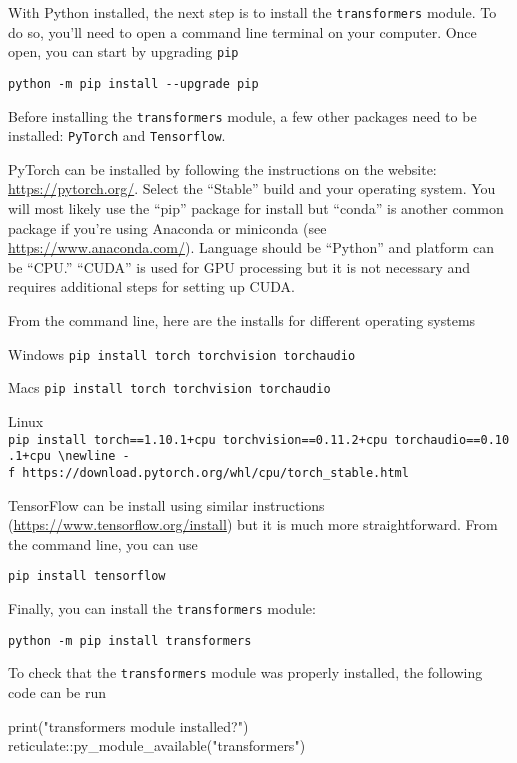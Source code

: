 \documentclass[
]{article}
\newenvironment{Shaded}{\begin{snugshade}}{\end{snugshade}}
\newcommand{\FunctionTok}[1]{\textcolor[rgb]{0.00,0.00,0.00}{#1}}
\newcommand{\NormalTok}[1]{#1}
\newcommand{\SpecialCharTok}[1]{\textcolor[rgb]{0.00,0.00,0.00}{#1}}
\newcommand{\StringTok}[1]{\textcolor[rgb]{0.31,0.60,0.02}{#1}}
\begin{document}
With Python installed, the next step is to install the
\texttt{transformers} module. To do so, you'll need to open a command
line terminal on your computer. Once open, you can start by upgrading
\texttt{pip}

\texttt{python\ -m\ pip\ install\ -\/-upgrade\ pip}

Before installing the \texttt{transformers} module, a few other packages
need to be installed: \texttt{PyTorch} and \texttt{Tensorflow}.

PyTorch can be installed by following the instructions on the website:
\url{https://pytorch.org/}. Select the ``Stable'' build and your
operating system. You will most likely use the ``pip'' package for
install but ``conda'' is another common package if you're using Anaconda
or miniconda (see \url{https://www.anaconda.com/}). Language should be
``Python'' and platform can be ``CPU.'' ``CUDA'' is used for GPU
processing but it is not necessary and requires additional steps for
setting up CUDA.

From the command line, here are the installs for different operating
systems

Windows \newline \texttt{pip\ install\ torch\ torchvision\ torchaudio}

Macs \newline \texttt{pip\ install\ torch\ torchvision\ torchaudio}

Linux \newline
\texttt{pip\ install\ torch==1.10.1+cpu\ torchvision==0.11.2+cpu\ torchaudio==0.10.1+cpu\ \textbackslash{}newline\ -f\ https://download.pytorch.org/whl/cpu/torch\_stable.html}

TensorFlow can be install using similar instructions
(\url{https://www.tensorflow.org/install}) but it is much more
straightforward. From the command line, you can use

\texttt{pip\ install\ tensorflow}

Finally, you can install the \texttt{transformers} module:

\texttt{python\ -m\ pip\ install\ transformers}

To check that the \texttt{transformers} module was properly installed,
the following code can be run

\begin{Shaded}
\begin{Highlighting}[]
\FunctionTok{print}\NormalTok{(}\StringTok{"\textquotesingle{}transformers\textquotesingle{} module installed?"}\NormalTok{)}
\NormalTok{reticulate}\SpecialCharTok{::}\FunctionTok{py\_module\_available}\NormalTok{(}\StringTok{"transformers"}\NormalTok{)}
\end{Highlighting}
\end{Shaded}
\end{document}

